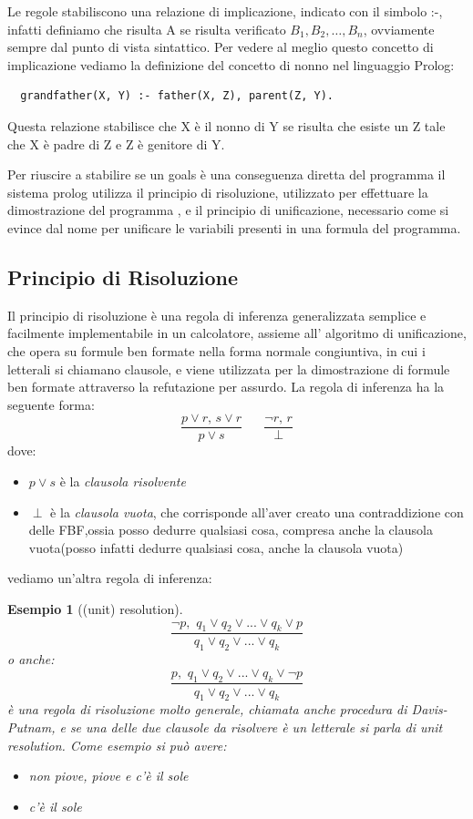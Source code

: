 \documentclass[a4paper]{report}
\newtheorem{esempio}{Esempio}
\begin{document}
Le regole stabiliscono una relazione di implicazione, indicato con il simbolo :-, infatti definiamo che risulta A se risulta verificato
$B_1, B_2, \dots, B_n$, ovviamente sempre dal punto di vista sintattico.
Per vedere al meglio questo concetto di implicazione vediamo la definizione del concetto di nonno nel linguaggio Prolog:
\begin{verbatim}
  grandfather(X, Y) :- father(X, Z), parent(Z, Y).
\end{verbatim}
Questa relazione stabilisce che X è il nonno di Y se risulta che esiste un Z tale che X è padre di Z e Z è genitore di Y.

Per riuscire a stabilire se un goals è una conseguenza diretta del programma il sistema prolog utilizza il principio di risoluzione,
utilizzato per effettuare la dimostrazione del programma , e il principio di unificazione, necessario come si evince dal nome per
unificare le variabili presenti in una formula del programma.

\subsection{Principio di Risoluzione}
Il principio di risoluzione è una regola di inferenza generalizzata semplice e facilmente implementabile in un calcolatore, assieme all'
algoritmo di unificazione, che opera su formule ben formate nella forma normale congiuntiva, in cui i letterali si chiamano clausole,
e viene utilizzata per la dimostrazione di formule ben formate attraverso la refutazione per assurdo.
La regola di inferenza ha la seguente forma:
$$\frac{p\vee r,\, s\lor r}{p\vee s}\,\,\,\,\,\,\,\,\,\,\frac{\neg r,\, r}{\perp}$$
dove:
\begin{itemize}
\item $p \lor  s$ è la \textit{clausola risolvente}
\item $\perp$ è la \textit{clausola vuota}, che corrisponde all'aver creato una contraddizione con delle FBF,ossia posso dedurre qualsiasi cosa,
       compresa anche la clausola vuota(posso infatti dedurre qualsiasi cosa, anche la clausola vuota)
\end{itemize}

vediamo un'altra regola di inferenza:
\begin{esempio}[(unit) resolution]
$$\frac{\neg p,\,\, q_1\vee q_2\vee ... \vee q_k \vee p}{q_1\vee q_2\vee ... \vee q_k}$$
o anche:
$$\frac{p,\,\, q_1\vee q_2\vee ... \vee q_k \vee \neg p}{q_1\vee q_2\vee ... \vee q_k}$$
è una regola di risoluzione molto generale, chiamata anche procedura di Davis-Putnam, e se una delle due clausole da risolvere
è un \textit{letterale} si parla di \emph{unit resolution}.\newline
Come esempio si può avere:
\begin{itemize}
\item non piove, piove e c'è il sole
\item c'è il sole
\end{itemize}
\end{esempio}
\end{document}
